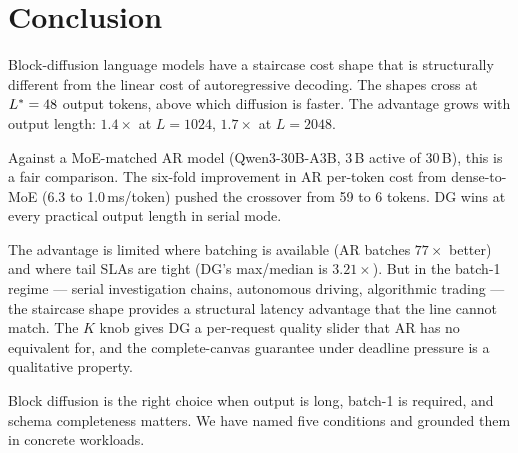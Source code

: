 \section{Conclusion}
\label{sec:conclusion}

Block-diffusion language models have a staircase cost shape that is
structurally different from the linear cost of autoregressive decoding.
The shapes cross at $L^{*} = 48$ output tokens, above which
diffusion is faster. The advantage grows with output length: $1.4\times$
at $L{=}1024$, $1.7\times$
at $L{=}2048$.

Against a MoE-matched AR model (Qwen3-30B-A3B, 3\,B active of 30\,B),
this is a fair comparison. The six-fold improvement in AR per-token
cost from dense-to-MoE (6.3 to 1.0\,ms/token) pushed the crossover
from 59 to 6 tokens. DG wins at every practical output length in serial mode.

The advantage is limited where batching is available (AR batches
$77\times$ better) and where tail SLAs are tight (DG's max/median is
$3.21\times$). But in the batch-1 regime --- serial investigation
chains, autonomous driving, algorithmic trading --- the staircase
shape provides a structural latency advantage that the line cannot
match. The $K$ knob gives DG a per-request quality slider that AR has
no equivalent for, and the complete-canvas guarantee under deadline
pressure is a qualitative property.

Block diffusion is the right choice when output is long, batch-1 is
required, and schema completeness matters. We have named five
conditions and grounded them in concrete workloads.
